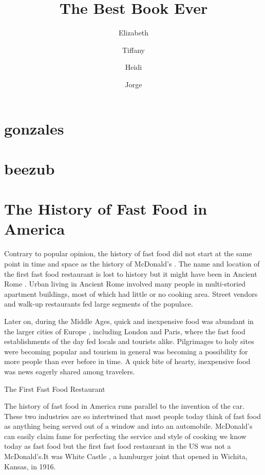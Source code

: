 \documentclass{book}\usepackage[]{graphicx}\usepackage[]{color}
\begin{document}
\title{The Best Book Ever}
\author{Elizabeth \and Tiffany \and Heidi \and Jorge}
\date{}
\maketitle

\tableofcontents


\chapter{gonzales}



\chapter{beezub}



\chapter{The History of Fast Food in America}

Contrary to popular opinion, the history of fast food did not start at the same point in time and space as the history of McDonald's . The name and location of the first fast food restaurant is lost to history but it might have been in Ancient Rome . Urban living in Ancient Rome involved many people in multi-storied apartment buildings, most of which had little or no cooking area. Street vendors and walk-up restaurants fed large segments of the populace.

Later on, during the Middle Ages, quick and inexpensive food was abundant in the larger cities of Europe , including London and Paris, where the fast food establishments of the day fed locals and tourists alike. Pilgrimages to holy sites were becoming popular and tourism in general was becoming a possibility for more people than ever before in time. A quick bite of hearty, inexpensive food was news eagerly shared among travelers.

The First Fast Food Restaurant

The history of fast food in America runs parallel to the invention of the car. These two industries are so intertwined that most people today think of fast food as anything being served out of a window and into an automobile. McDonald's can easily claim fame for perfecting the service and style of cooking we know today as fast food but the first fast food restaurant in the US was not a McDonald's.It was White Castle , a hamburger joint that opened in Wichita, Kansas, in 1916.
\end{document}

